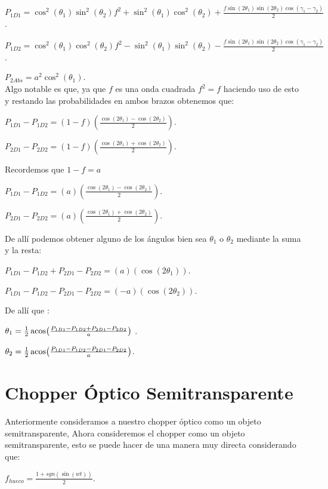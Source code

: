 \documentclass[11pt]{article}
\begin{document}
\vspace{15cm}

$P_{1D1}=\cos^2(\theta_{1})\sin^2(\theta_{2})f^2+ \sin^2(\theta_{1})\cos^2(\theta_{2})+\frac{f \sin(2\theta_{1})\sin(2\theta_{2})\cos(\gamma_{1}-\gamma_{2})}{2}$.

$P_{1D2}=\cos^2(\theta_{1})\cos^2(\theta_{2})f^2- \sin^2(\theta_{1})\sin^2(\theta_{2})-\frac{f \sin(2\theta_{1})\sin(2\theta_{2})\cos(\gamma_{1}-\gamma_{2})}{2}$.

$P_{2Abs}=a^2 \cos^2(\theta_{1})$.\\


Algo notable es que, ya que $f$ es una onda cuadrada $f^2=f$ haciendo uso de esto y restando las probabilidades en ambos brazos obtenemos que:

$P_{1D1}-P_{1D2}=(1-f)\left(\frac{\cos(2 \theta_{1})-\cos(2 \theta_{2})}{2}\right)$.

$P_{2D1}-P_{2D2}=(1-f)\left(\frac{\cos(2 \theta_{1})+\cos(2 \theta_{2})}{2}\right)$.

Recordemos que $1-f=a$

$P_{1D1}-P_{1D2}=(a)\left(\frac{\cos(2 \theta_{1})-\cos(2 \theta_{2})}{2}\right)$.

$P_{2D1}-P_{2D2}=(a)\left(\frac{\cos(2 \theta_{1})+\cos(2 \theta_{2})}{2}\right)$.

 De allí podemos obtener alguno de los ángulos bien sea $\theta_{1}$ o $\theta_
{2}$ mediante la suma y la resta:

$P_
{1D1}-P_
{1D2}+P_
{2D1}-P_
{2D2}=(a)(\cos
(2 \theta_
{1}))$.

$P_
{1D1}-P_
{1D2}-P_
{2D1}-P_
{2D2}=(-a
)(\cos
(2 \theta_
{2}))$.

De allí que :

 
$ \theta_
{1}=\frac{1}{2}\acos(\frac{P_
{1D1}-P_
{1D2}+P_
{2D1}-P_
{2D2}}{a})$ .

$\theta_
{2}=\frac{1}{2}\acos(\frac{P_
{1D1}-P_
{1D2}-P_
{2D1}-P_
{2D2}}{a})$.

\section{Chopper Óptico Semitransparente}

Anteriormente consideramos a nuestro chopper
 óptico como un objeto semitransparente, Ahora consideremos el chopper
 como un objeto semitransparente, esto se puede hacer de una manera muy directa considerando que:
 
 $f_{hueco}=\frac{1+sgn(\sin(wt))}{2}$.
\end{document}
